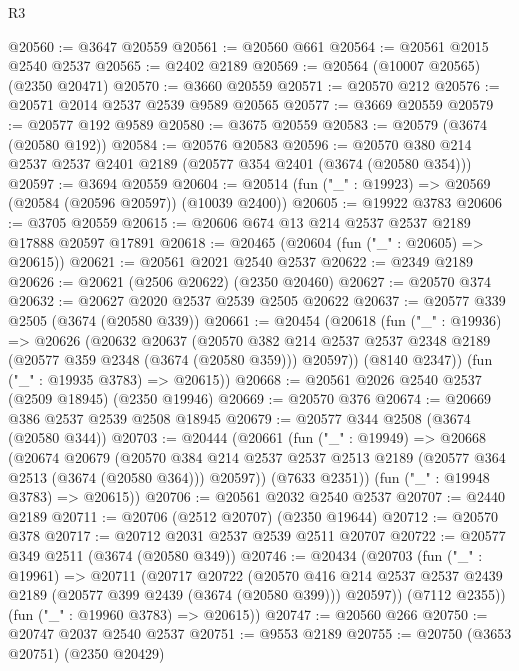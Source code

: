 \begin{lexlean}{R3}
\begin{coremodule}
@20560 := @3647 @20559
@20561 := @20560 @661
@20564 := @20561 @2015 @2540 @2537
@20565 := @2402 @2189
@20569 := @20564 (@10007 @20565) (@2350 @20471)
@20570 := @3660 @20559
@20571 := @20570 @212
@20576 := @20571 @2014 @2537 @2539 @9589 @20565
@20577 := @3669 @20559
@20579 := @20577 @192 @9589
@20580 := @3675 @20559
@20583 := @20579 (@3674 (@20580 @192))
@20584 := @20576 @20583
@20596 := @20570 @380 @214 @2537 @2537 @2401 @2189 (@20577 @354 @2401 (@3674 (@20580 @354)))
@20597 := @3694 @20559
@20604 := @20514 (fun ("_" : @19923) => @20569 (@20584 (@20596 @20597)) (@10039 @2400))
@20605 := @19922 @3783
@20606 := @3705 @20559
@20615 := @20606 @674 @13 @214 @2537 @2537 @2189 @17888 @20597 @17891
@20618 := @20465 (@20604 (fun ("_" : @20605) => @20615))
@20621 := @20561 @2021 @2540 @2537
@20622 := @2349 @2189
@20626 := @20621 (@2506 @20622) (@2350 @20460)
@20627 := @20570 @374
@20632 := @20627 @2020 @2537 @2539 @2505 @20622
@20637 := @20577 @339 @2505 (@3674 (@20580 @339))
@20661 := @20454
    (@20618
      (fun ("_" : @19936) =>
      @20626
        (@20632
          @20637
          (@20570
            @382
            @214
            @2537
            @2537
            @2348
            @2189
            (@20577 @359 @2348 (@3674 (@20580 @359)))
            @20597))
        (@8140 @2347))
      (fun ("_" : @19935 @3783) => @20615))
@20668 := @20561 @2026 @2540 @2537 (@2509 @18945) (@2350 @19946)
@20669 := @20570 @376
@20674 := @20669 @386 @2537 @2539 @2508 @18945
@20679 := @20577 @344 @2508 (@3674 (@20580 @344))
@20703 := @20444
    (@20661
      (fun ("_" : @19949) =>
      @20668
        (@20674
          @20679
          (@20570
            @384
            @214
            @2537
            @2537
            @2513
            @2189
            (@20577 @364 @2513 (@3674 (@20580 @364)))
            @20597))
        (@7633 @2351))
      (fun ("_" : @19948 @3783) => @20615))
@20706 := @20561 @2032 @2540 @2537
@20707 := @2440 @2189
@20711 := @20706 (@2512 @20707) (@2350 @19644)
@20712 := @20570 @378
@20717 := @20712 @2031 @2537 @2539 @2511 @20707
@20722 := @20577 @349 @2511 (@3674 (@20580 @349))
@20746 := @20434
    (@20703
      (fun ("_" : @19961) =>
      @20711
        (@20717
          @20722
          (@20570
            @416
            @214
            @2537
            @2537
            @2439
            @2189
            (@20577 @399 @2439 (@3674 (@20580 @399)))
            @20597))
        (@7112 @2355))
      (fun ("_" : @19960 @3783) => @20615))
@20747 := @20560 @266
@20750 := @20747 @2037 @2540 @2537
@20751 := @9553 @2189
@20755 := @20750 (@3653 @20751) (@2350 @20429)

\end{coremodule}
\end{lexlean}

